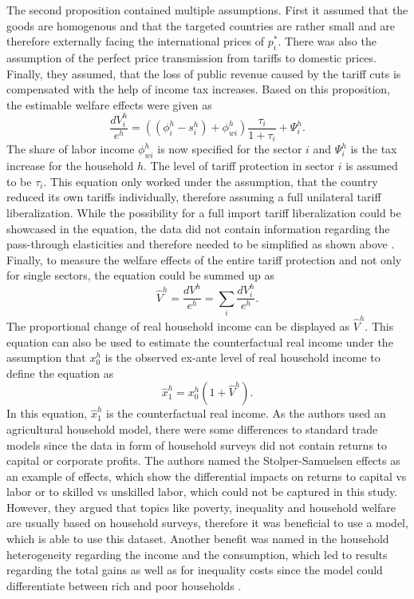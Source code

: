 The second proposition contained multiple assumptions. First it assumed that the goods are homogenous and that the 
targeted countries are rather small and are therefore externally facing the international prices of \(p_{i}^*\). There was also
the assumption of the perfect price transmission from tariffs to domestic prices. Finally, they assumed, that the loss of public
revenue caused by the tariff cuts is compensated with the help of income tax increases. Based on this proposition, the estimable
welfare effects were given as
\begin{equation} \label{eq:equation5}
    \frac{dV_{i}^h}{e^h}=((\phi_{i}^h-s_{i}^h)+\phi_{wi}^h) \frac{\tau_{i}}{1+\tau_{i}}+\Psi_{i}^h.
\end{equation}
The share of labor income \(\phi_{wi}^h\) is now specified for the sector \(i\) and \(\Psi_{i}^h\) is the tax increase for the
household \(h\). The level of tariff protection in sector \(i\) is assumed to be \(\tau_{i}\).
This equation only worked under the assumption, that the country reduced its own tariffs individually, therefore assuming a full
unilateral tariff liberalization. While the possibility for a full import tariff liberalization could be showcased in the equation,
the data did not contain information regarding the pass-through elasticities and therefore needed to be simplified as shown
above \parencite[p.~7]{Artuc.2019}.\\
Finally, to measure the welfare effects of the entire tariff protection and not only for single sectors, the equation
could be summed up as 
\begin{equation} \label{eq:equation7}
    \hat{V}^h = \frac{dV^h}{e^h} = \sum_{i} \frac{dV_{i}^h}{e^h}.
\end{equation}
The proportional change of real household income can be displayed as \(\hat{V}^h\). This equation can also be used to estimate
the counterfactual real income under the assumption that \(x_{0}^h\) is the observed ex-ante level of real household income to
define the equation as 
\begin{equation} \label{eq:equation8}
    \hat{x}_{1}^h = x_{0}^h(1+\hat{V}^h).
\end{equation}
In this equation, \(\hat{x}_{1}^h\) is the counterfactual real income.
As the authors used an agricultural household model, there were some differences to standard trade models since the data in form
of household surveys did not contain returns to capital or corporate profits. The authors named the Stolper-Samuelsen effects
as an example of effects, which show the differential impacts on returns to capital vs labor or to skilled vs unskilled labor, 
which could not be captured in this study. However, they argued that topics like poverty, inequality and household welfare are
usually based on household surveys, therefore it was beneficial to use a model, which is able to use this dataset. Another
benefit was named in the household heterogeneity regarding the income and the consumption, which led to results regarding the
total gains as well as for inequality costs since the model could differentiate between rich and poor households \parencite[pp.~8-9]{Artuc.2019}.\\

